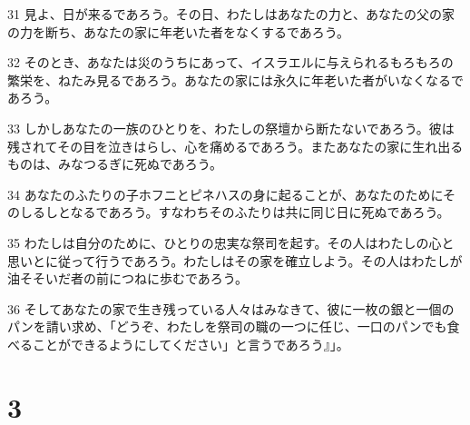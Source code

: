 \par 31 見よ、日が来るであろう。その日、わたしはあなたの力と、あなたの父の家の力を断ち、あなたの家に年老いた者をなくするであろう。
\par 32 そのとき、あなたは災のうちにあって、イスラエルに与えられるもろもろの繁栄を、ねたみ見るであろう。あなたの家には永久に年老いた者がいなくなるであろう。
\par 33 しかしあなたの一族のひとりを、わたしの祭壇から断たないであろう。彼は残されてその目を泣きはらし、心を痛めるであろう。またあなたの家に生れ出るものは、みなつるぎに死ぬであろう。
\par 34 あなたのふたりの子ホフニとピネハスの身に起ることが、あなたのためにそのしるしとなるであろう。すなわちそのふたりは共に同じ日に死ぬであろう。
\par 35 わたしは自分のために、ひとりの忠実な祭司を起す。その人はわたしの心と思いとに従って行うであろう。わたしはその家を確立しよう。その人はわたしが油そそいだ者の前につねに歩むであろう。
\par 36 そしてあなたの家で生き残っている人々はみなきて、彼に一枚の銀と一個のパンを請い求め、「どうぞ、わたしを祭司の職の一つに任じ、一口のパンでも食べることができるようにしてください」と言うであろう』」。

\chapter{3}

